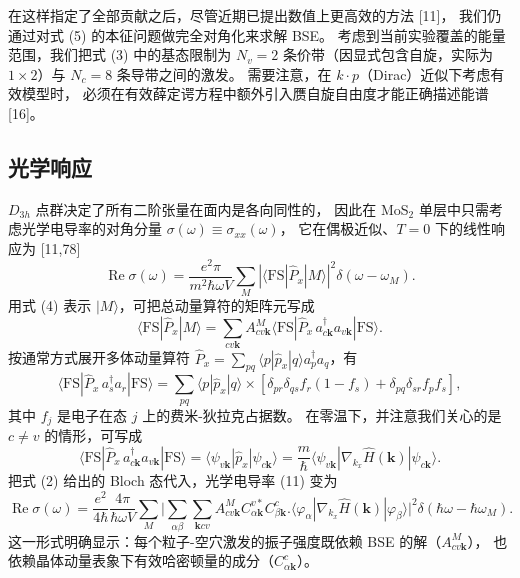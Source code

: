 \documentclass[11pt,a4paper]{ctexart}
\begin{document}
在这样指定了全部贡献之后，尽管近期已提出数值上更高效的方法 [11]，
我们仍通过对式 (5) 的本征问题做完全对角化来求解 BSE。
考虑到当前实验覆盖的能量范围，我们把式 (3) 中的基态限制为
$N_v=2$ 条价带（因显式包含自旋，实际为 $1\times2$）与 $N_c=8$ 条导带之间的激发。
需要注意，在 $k\cdot p$（Dirac）近似下考虑有效模型时，
必须在有效薛定谔方程中额外引入赝自旋自由度才能正确描述能谱 [16]。

\subsection{光学响应}

$D_{3h}$ 点群决定了所有二阶张量在面内是各向同性的，
因此在 MoS$_2$ 单层中只需考虑光学电导率的对角分量 $\sigma(\omega)\equiv\sigma_{xx}(\omega)$，
它在偶极近似、$T=0$ 下的线性响应为 [11,78]
\begin{equation}
\operatorname{Re}\sigma(\omega)=\frac{e^2\pi}{m^2\hbar\omega V}
\sum_M\left|\langle\mathrm{FS}|\hat P_x|M\rangle\right|^2
\delta(\omega-\omega_M).
\end{equation}
用式 (4) 表示 $|M\rangle$，可把总动量算符的矩阵元写成
\begin{equation}
\langle\mathrm{FS}|\hat P_x|M\rangle
=\sum_{cv\mathbf k}A^{M}_{cv\mathbf k}
\langle\mathrm{FS}|\hat P_x\,a^{\dagger}_{c\mathbf k}a_{v\mathbf k}|\mathrm{FS}\rangle .
\end{equation}
按通常方式展开多体动量算符 $\hat P_x=\sum_{pq}\langle p|\hat p_x|q\rangle a^{\dagger}_pa_q$，有
\begin{equation}
\langle\mathrm{FS}|\hat P_x\,a^{\dagger}_sa_r|\mathrm{FS}\rangle
=\sum_{pq}\langle p|\hat p_x|q\rangle
\times\left[\delta_{pr}\delta_{qs}f_r(1-f_s)+\delta_{pq}\delta_{sr}f_pf_s\right],
\end{equation}
其中 $f_j$ 是电子在态 $j$ 上的费米-狄拉克占据数。
在零温下，并注意我们关心的是 $c\ne v$ 的情形，可写成
\begin{equation}
\langle\mathrm{FS}|\hat P_x\,a^{\dagger}_{c\mathbf k}a_{v\mathbf k}|\mathrm{FS}\rangle
=\langle\psi_{v\mathbf k}|\hat p_x|\psi_{c\mathbf k}\rangle
=\frac{m}{\hbar}\langle\psi_{v\mathbf k}|\nabla_{k_x}\hat H(\mathbf k)|\psi_{c\mathbf k}\rangle .
\end{equation}
把式 (2) 给出的 Bloch 态代入，光学电导率 (11) 变为
\begin{equation}
\operatorname{Re}\sigma(\omega)
=\frac{e^2}{4\hbar}\frac{4\pi}{\hbar\omega V}
\sum_M\Biggl|
\sum_{\alpha\beta}\sum_{\mathbf k cv}A^{M}_{cv\mathbf k}
C^{v*}_{\alpha\mathbf k}C^{c}_{\beta\mathbf k}
\Biggl.\langle\varphi_\alpha|\nabla_{k_x}\hat H(\mathbf k)|\varphi_\beta\rangle
\Biggr|^2\delta(\hbar\omega-\hbar\omega_M).
\end{equation}
这一形式明确显示：每个粒子-空穴激发的振子强度既依赖 BSE 的解（$A^{M}_{cv\mathbf k}$），
也依赖晶体动量表象下有效哈密顿量的成分（$C^{c}_{\alpha\mathbf k}$）。
\end{document}
